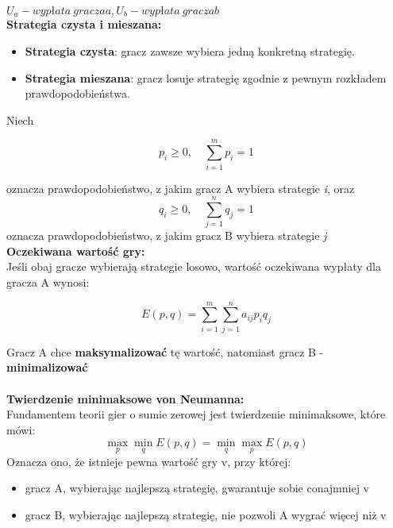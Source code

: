 \documentclass[12pt]{article}
\begin{document}
\emph{$U_{a}-wypłata\ gracza a,  U_{b}-wypłata\ gracza b$}
\\
\textbf{Strategia czysta i mieszana:}
\begin{itemize}
\item \textbf{Strategia czysta}: gracz zawsze wybiera jedną konkretną strategię.
\item \textbf{Strategia mieszana}: gracz losuje strategię zgodnie z pewnym rozkładem prawdopodobieństwa.
\end {itemize}
Niech
\begin{center}
\begin{equation}
p_i \ge 0, \quad \sum_{i=1}^{m} p_i = 1
\end{equation}
\end{center}
oznacza prawdopodobieństwo, z jakim gracz A wybiera strategie \emph{i}, oraz
\begin{equation}
q_i \ge 0, \quad \sum_{j=1}^{n} q_j = 1
\end{equation}
oznacza prawdopodobieństwo, z jakim gracz B wybiera strategie \emph{j}
\\
\textbf{Oczekiwana wartość gry:}
\\
Jeśli obaj gracze wybierają strategie losowo, wartość oczekiwana wypłaty dla gracza A wynosi:
\\
\begin{center}

\begin{equation}
E(p,q) =  \sum_{i=1}^{m}  \sum_{j=1}^{n} a_{ij}p_{i}q_{j}
\end{equation}
\end{center}
Gracz A chce \textbf{maksymalizować} tę wartość, natomiast gracz B - \textbf{minimalizować}
\\
\\
\textbf{Twierdzenie minimaksowe von Neumanna:}
\\
Fundamentem teorii gier o sumie zerowej jest twierdzenie minimaksowe, które mówi:
\\
\begin{equation}
\displaystyle  \max_{p} \displaystyle \min_{q} E(p,q) = \displaystyle \min_{q} \displaystyle \max_{p} E(p,q)
\end{equation}
Oznacza ono, że istnieje pewna wartość gry v, przy której:
\begin{itemize}
\item gracz A, wybierając najlepszą strategię, gwarantuje sobie conajmniej v
\item gracz B, wybierając najlepszą strategię, nie pozwoli A wygrać więcej niż v
\end{itemize}
\end{document}
